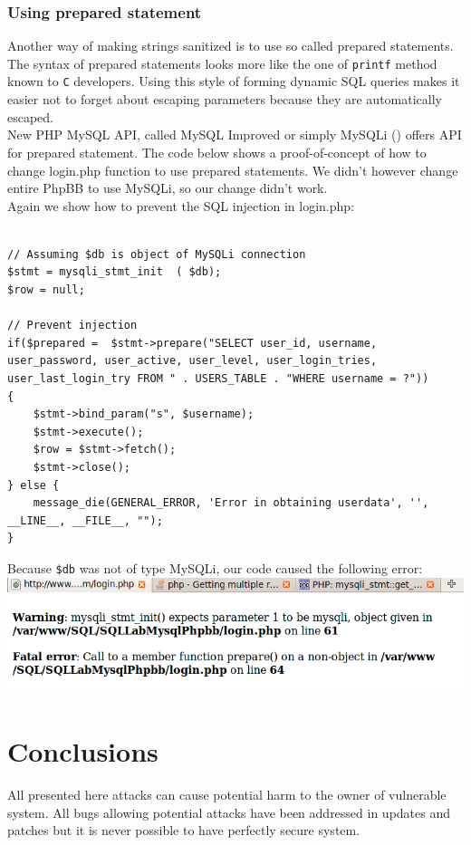 \documentclass[12pt, a4paper]{article}
\begin{document}
\subsubsection{Using prepared statement}
Another way of making strings sanitized is to use so called prepared statements. The syntax of prepared statements looks more like the one of \texttt{printf} method known to \texttt{C} developers. Using this style of forming dynamic SQL queries makes it easier not to forget about escaping parameters because they are automatically escaped.\\

New PHP MySQL API, called MySQL Improved or simply MySQLi (\cite{mysqli}) offers API for prepared statement. The code below shows a proof-of-concept of how to change login.php function to use prepared statements. We didn't however change entire PhpBB to use MySQLi, so our change didn't work.\\

Again we show how to prevent the SQL injection in login.php:
\lstset{
	captionpos=b,
	frame=single,
	language=PHP,
	breaklines=true,
	label=sqladdslash4
}
\begin{lstlisting}	

// Assuming $db is object of MySQLi connection
$stmt = mysqli_stmt_init  ( $db);
$row = null;

// Prevent injection
if($prepared =  $stmt->prepare("SELECT user_id, username, user_password, user_active, user_level, user_login_tries, user_last_login_try FROM " . USERS_TABLE . "WHERE username = ?"))
{
	$stmt->bind_param("s", $username);
	$stmt->execute();
	$row = $stmt->fetch();
	$stmt->close();
} else {
	message_die(GENERAL_ERROR, 'Error in obtaining userdata', '', __LINE__, __FILE__, "");
}
\end{lstlisting}

Because \texttt{\$db} was not of type MySQLi, our code caused the following error:\\
\includegraphics[width=.95\textwidth]{gfx/sql/mysqli.png}

\section{Conclusions}
All presented here attacks can cause potential harm to the owner of vulnerable system. All bugs allowing potential attacks have been addressed in updates and patches but it is never possible to have perfectly secure system.
\end{document}
